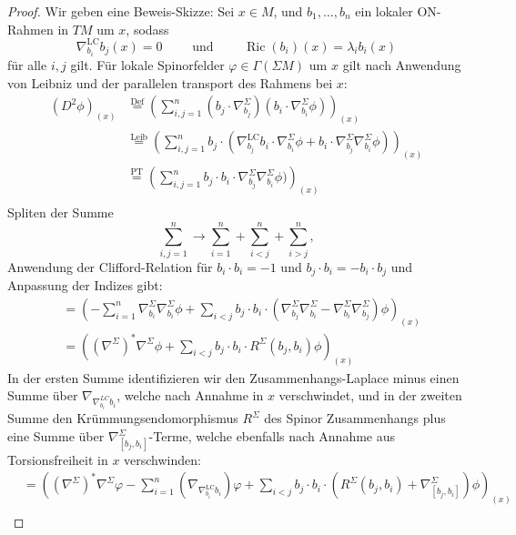 \documentclass[10pt, letterpaper]{article}
\begin{document}
\begin{proof}
  Wir geben eine Beweis-Skizze: Sei $x \in M$, und $b_1, \ldots, b_n$ ein lokaler ON-Rahmen in $TM$ um $x$, sodass 
  $$\nabla_{b_i}^{\mathrm{LC}} b_j(x)=0\qquad \text{ und }\qquad \operatorname{Ric}\left(b_i\right)(x)=\lambda_i b_i(x)$$
  für alle $i, j$ gilt. Für lokale Spinorfelder $\varphi \in \Gamma(\Sigma M)$ um $x$ gilt nach Anwendung von Leibniz und der parallelen transport des Rahmens bei $x$:
  $$\begin{aligned}
    \left(D^2 \phi\right)_{(x)} 
    & \stackrel{\text{Def}}{=}\left(\sum_{i, j=1}^n \left(b_j \cdot \nabla_{b_j}^{\Sigma}\right)\left( b_i \cdot \nabla_{b_i}^{\Sigma} \phi \right)\right)_{(x)} \\ 
    & \stackrel{\text{Leib}}{=}\left(\sum_{i, j=1}^n b_j \cdot(\nabla_{b_j}^{\mathrm{LC}} b_i \cdot \nabla_{b_i}^{\Sigma} \phi+b_i \cdot \nabla_{b_j}^{\Sigma} \nabla_{b_i}^{\Sigma} \phi)\right)_{(x)} \\ 
    & \stackrel{\text{PT}}{=}\left(\sum_{i, j=1}^n b_j \cdot b_i \cdot \nabla_{b_j}^{\Sigma} \nabla_{b_i}^{\Sigma} \phi)\right)_{(x)} \\ 
  \end{aligned}$$
  Spliten der Summe
  $$\sum_{i,j=1}^n\to \sum_{i=1}^n + \sum_{i<j}^n + \sum_{i>j}^n,$$
  Anwendung der Clifford-Relation für $ b_i \cdot b_i=-1$ und $b_j\cdot b_i=-b_i\cdot b_j$ und Anpassung der Indizes gibt:
  $$\begin{aligned} 
    & = \left(-\sum_{i=1}^n \nabla_{b_i}^{\Sigma} \nabla_{b_i}^{\Sigma} \phi+\sum_{i<j} b_j \cdot b_i \cdot\left(\nabla_{b_j}^{\Sigma} \nabla_{b_i}^{\Sigma}-\nabla_{b_i}^{\Sigma} \nabla_{b_j}^{\Sigma}\right) \phi\right)_{(x)} \\ 
    & =\left(\left(\nabla^{\Sigma}\right)^* \nabla^{\Sigma} \phi+\sum_{i<j} b_j \cdot b_i \cdot R^{\Sigma}\left(b_j, b_i\right) \phi\right)_{(x)}
  \end{aligned}$$
  In der ersten Summe identifizieren wir den Zusammenhangs-Laplace minus einen Summe über $\nabla_{\nabla_{b_i}^{LC}b_i}$, welche nach Annahme in $x$ verschwindet, und in der zweiten Summe den Krümmungsendomorphismus $R^\Sigma$ des Spinor Zusammenhangs plus eine Summe über $\nabla^\Sigma_{[b_j,b_i]}$-Terme, welche ebenfalls nach Annahme aus Torsionsfreiheit in $x$ verschwinden:
  $$\begin{aligned} 
    & = \left(\left(\nabla^{\Sigma}\right)^* \nabla^{\Sigma}\varphi - \sum_{i=1}^n\left(\nabla_{\nabla_{b_i}^{\mathrm{LC}} b_i}\right)\varphi +\sum_{i<j} b_j \cdot b_i \cdot\left(R^{\Sigma}\left(b_j, b_i\right) + \nabla^\Sigma_{[b_j,b_i]}\right) \phi\right)_{(x)} \\ 

\end{aligned}$$
\end{proof}
\end{document}
